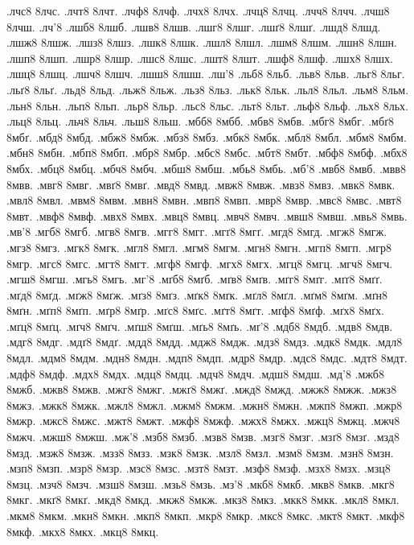 {.лчс8 8лчс.
.лчт8 8лчт.
.лчф8 8лчф.
.лчх8 8лчх.
.лчц8 8лчц.
.лчч8 8лчч.
.лчш8 8лчш.
.лч'8
.лшб8 8лшб.
.лшв8 8лшв.
.лшг8 8лшг.
.лшґ8 8лшґ.
.лшд8 8лшд.
.лшж8 8лшж.
.лшз8 8лшз.
.лшк8 8лшк.
.лшл8 8лшл.
.лшм8 8лшм.
.лшн8 8лшн.
.лшп8 8лшп.
.лшр8 8лшр.
.лшс8 8лшс.
.лшт8 8лшт.
.лшф8 8лшф.
.лшх8 8лшх.
.лшц8 8лшц.
.лшч8 8лшч.
.лшш8 8лшш.
.лш'8
.льб8 8льб.
.льв8 8льв.
.льг8 8льг.
.льґ8 8льґ.
.льд8 8льд.
.льж8 8льж.
.льз8 8льз.
.льк8 8льк.
.льл8 8льл.
.льм8 8льм.
.льн8 8льн.
.льп8 8льп.
.льр8 8льр.
.льс8 8льс.
.льт8 8льт.
.льф8 8льф.
.льх8 8льх.
.льц8 8льц.
.льч8 8льч.
.льш8 8льш.
.мбб8 8мбб.
.мбв8 8мбв.
.мбг8 8мбг.
.мбґ8 8мбґ.
.мбд8 8мбд.
.мбж8 8мбж.
.мбз8 8мбз.
.мбк8 8мбк.
.мбл8 8мбл.
.мбм8 8мбм.
.мбн8 8мбн.
.мбп8 8мбп.
.мбр8 8мбр.
.мбс8 8мбс.
.мбт8 8мбт.
.мбф8 8мбф.
.мбх8 8мбх.
.мбц8 8мбц.
.мбч8 8мбч.
.мбш8 8мбш.
.мбь8 8мбь.
.мб'8
.мвб8 8мвб.
.мвв8 8мвв.
.мвг8 8мвг.
.мвґ8 8мвґ.
.мвд8 8мвд.
.мвж8 8мвж.
.мвз8 8мвз.
.мвк8 8мвк.
.мвл8 8мвл.
.мвм8 8мвм.
.мвн8 8мвн.
.мвп8 8мвп.
.мвр8 8мвр.
.мвс8 8мвс.
.мвт8 8мвт.
.мвф8 8мвф.
.мвх8 8мвх.
.мвц8 8мвц.
.мвч8 8мвч.
.мвш8 8мвш.
.мвь8 8мвь.
.мв'8
.мгб8 8мгб.
.мгв8 8мгв.
.мгг8 8мгг.
.мгґ8 8мгґ.
.мгд8 8мгд.
.мгж8 8мгж.
.мгз8 8мгз.
.мгк8 8мгк.
.мгл8 8мгл.
.мгм8 8мгм.
.мгн8 8мгн.
.мгп8 8мгп.
.мгр8 8мгр.
.мгс8 8мгс.
.мгт8 8мгт.
.мгф8 8мгф.
.мгх8 8мгх.
.мгц8 8мгц.
.мгч8 8мгч.
.мгш8 8мгш.
.мгь8 8мгь.
.мг'8
.мґб8 8мґб.
.мґв8 8мґв.
.мґг8 8мґг.
.мґґ8 8мґґ.
.мґд8 8мґд.
.мґж8 8мґж.
.мґз8 8мґз.
.мґк8 8мґк.
.мґл8 8мґл.
.мґм8 8мґм.
.мґн8 8мґн.
.мґп8 8мґп.
.мґр8 8мґр.
.мґс8 8мґс.
.мґт8 8мґт.
.мґф8 8мґф.
.мґх8 8мґх.
.мґц8 8мґц.
.мґч8 8мґч.
.мґш8 8мґш.
.мґь8 8мґь.
.мґ'8
.мдб8 8мдб.
.мдв8 8мдв.
.мдг8 8мдг.
.мдґ8 8мдґ.
.мдд8 8мдд.
.мдж8 8мдж.
.мдз8 8мдз.
.мдк8 8мдк.
.мдл8 8мдл.
.мдм8 8мдм.
.мдн8 8мдн.
.мдп8 8мдп.
.мдр8 8мдр.
.мдс8 8мдс.
.мдт8 8мдт.
.мдф8 8мдф.
.мдх8 8мдх.
.мдц8 8мдц.
.мдч8 8мдч.
.мдш8 8мдш.
.мд'8
.мжб8 8мжб.
.мжв8 8мжв.
.мжг8 8мжг.
.мжґ8 8мжґ.
.мжд8 8мжд.
.мжж8 8мжж.
.мжз8 8мжз.
.мжк8 8мжк.
.мжл8 8мжл.
.мжм8 8мжм.
.мжн8 8мжн.
.мжп8 8мжп.
.мжр8 8мжр.
.мжс8 8мжс.
.мжт8 8мжт.
.мжф8 8мжф.
.мжх8 8мжх.
.мжц8 8мжц.
.мжч8 8мжч.
.мжш8 8мжш.
.мж'8
.мзб8 8мзб.
.мзв8 8мзв.
.мзг8 8мзг.
.мзґ8 8мзґ.
.мзд8 8мзд.
.мзж8 8мзж.
.мзз8 8мзз.
.мзк8 8мзк.
.мзл8 8мзл.
.мзм8 8мзм.
.мзн8 8мзн.
.мзп8 8мзп.
.мзр8 8мзр.
.мзс8 8мзс.
.мзт8 8мзт.
.мзф8 8мзф.
.мзх8 8мзх.
.мзц8 8мзц.
.мзч8 8мзч.
.мзш8 8мзш.
.мзь8 8мзь.
.мз'8
.мкб8 8мкб.
.мкв8 8мкв.
.мкг8 8мкг.
.мкґ8 8мкґ.
.мкд8 8мкд.
.мкж8 8мкж.
.мкз8 8мкз.
.мкк8 8мкк.
.мкл8 8мкл.
.мкм8 8мкм.
.мкн8 8мкн.
.мкп8 8мкп.
.мкр8 8мкр.
.мкс8 8мкс.
.мкт8 8мкт.
.мкф8 8мкф.
.мкх8 8мкх.
.мкц8 8мкц.
}
